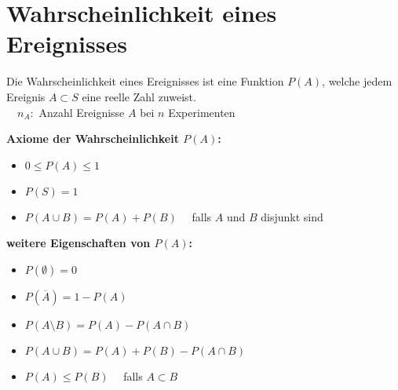 	\section{Wahrscheinlichkeit eines Ereignisses}
		Die Wahrscheinlichkeit eines Ereignisses ist eine Funktion $P(A)$, welche jedem Ereignis $A \subset S$ eine reelle Zahl zuweist.\\[0.2cm]
		 $\quad n_A:$ Anzahl Ereignisse $A$ bei $n$ Experimenten\\[0.4cm]
		\begin{minipage}[t]{0.6\textwidth}
			\textbf{Axiome der Wahrscheinlichkeit $P(A)$:}\\[-0.2cm]
			\begin{itemize}
				\item $0\leq P(A) \leq 1$\\[-0.2cm]
				\item $P(S) = 1$\\[-0.2cm]
				\item $P(A\cup B) = P(A) + P(B)\quad$ falls $A$ und $B$ disjunkt sind\\[-0.2cm]
			\end{itemize}
		\end{minipage}
		\begin{minipage}[t]{0.4\textwidth}
			\textbf{weitere Eigenschaften von $P(A)$:}\\[-0.2cm]
			\begin{itemize}
				\item $P(\emptyset)=0$\\[-0.2cm]
				\item $P(\overline{A}) = 1 - P(A)$\\[-0.2cm]
				\item $P(A\setminus B) = P(A) - P(A\cap B)$\\[-0.2cm]
				\item $P(A\cup B) = P(A) + P(B) - P(A\cap B)$\\[-0.2cm]
				\item $P(A)\leq P(B)\quad$ falls $A\subset B$\\[-0.2cm]
			\end{itemize}
		\end{minipage}
		
